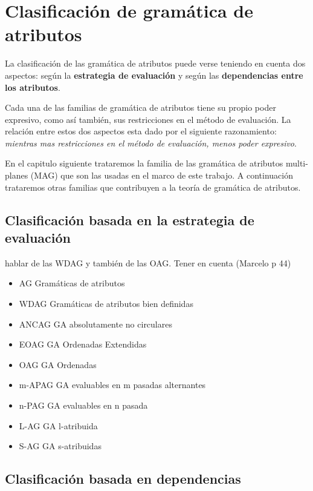\chapter{Clasificación de gramática de atributos}
\label{chap: clas_ag}
\minitoc

La clasificación de las gramática de atributos puede verse teniendo en cuenta dos aspectos: según la\textbf{ estrategia de evaluación} y según las \textbf{dependencias entre los atributos}. 

Cada una de las familias de gramática de atributos tiene su propio poder expresivo, como así también, sus restricciones en el método de evaluación. La relación entre estos dos aspectos esta dado por el siguiente razonamiento: \textit{mientras mas restricciones en el método de evaluación, menos poder expresivo}.

En el capitulo siguiente trataremos la familia de las gramática de atributos multi-planes (MAG) que son las usadas en el marco de este trabajo. A continuación trataremos otras familias que contribuyen a la teoría de gramática de atributos.

\section{Clasificación basada en la estrategia de evaluación}

hablar de las WDAG y también de las OAG. Tener en cuenta (Marcelo p 44)

\begin{itemize}
\item AG      Gramáticas de atributos
\item WDAG    Gramáticas de atributos bien definidas   
\item ANCAG   GA absolutamente no circulares
\item EOAG    GA Ordenadas Extendidas
\item OAG     GA Ordenadas       
\item m-APAG  GA evaluables en m pasadas alternantes       
\item n-PAG   GA evaluables en n pasada       
\item L-AG    GA l-atribuida        
\item S-AG    GA s-atribuidas
\end{itemize}

\section{Clasificación basada en dependencias}

